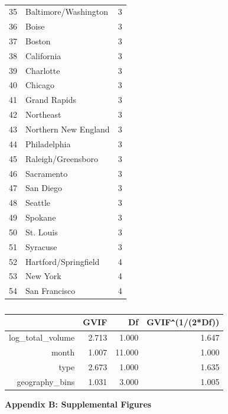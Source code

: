 \documentclass[11pt]{article}\usepackage[]{graphicx}\usepackage[]{color}
\begin{document}
\begin{center}
\begin{table}[ht]
\begin{tabular}{rll}
  35 & Baltimore/Washington & 3 \\ 
  36 & Boise & 3 \\ 
  37 & Boston & 3 \\ 
  38 & California & 3 \\ 
  39 & Charlotte & 3 \\ 
  40 & Chicago & 3 \\ 
  41 & Grand Rapids & 3 \\ 
  42 & Northeast & 3 \\ 
  43 & Northern New England & 3 \\ 
  44 & Philadelphia & 3 \\ 
  45 & Raleigh/Greensboro & 3 \\ 
  46 & Sacramento & 3 \\ 
  47 & San Diego & 3 \\ 
  48 & Seattle & 3 \\ 
  49 & Spokane & 3 \\ 
  50 & St. Louis & 3 \\ 
  51 & Syracuse & 3 \\ 
  52 & Hartford/Springfield & 4 \\ 
  53 & New York & 4 \\ 
  54 & San Francisco & 4 \\ 
   \hline
\end{tabular}
\caption{} 
\label{region}
\end{table}
\begin{table}[ht]
\centering
\begin{tabular}{rrrr}
  \hline
 & GVIF & Df & GVIF\verb|^|(1/(2*Df)) \\ 
  \hline
log\_total\_volume & 2.713 & 1.000 & 1.647 \\ 
  month & 1.007 & 11.000 & 1.000 \\ 
  type & 2.673 & 1.000 & 1.635 \\ 
  geography\_bins & 1.031 & 3.000 & 1.005 \\ 
   \hline
\end{tabular}
\caption{} 
\label{vif_table}
\end{table}

\end{center} 


\clearpage
\newpage
\noindent \Large{{\bf Appendix B: Supplemental Figures}}
\end{document}
